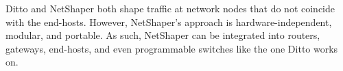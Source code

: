 Ditto \cite{meier2022ditto} and NetShaper both shape traffic at network nodes that do not coincide with the end-hosts.
However, NetShaper's approach is hardware-independent, modular, and portable.
As such, NetShaper can be integrated into routers, gateways, end-hosts, and even programmable switches like the one Ditto works on.

\endinput

